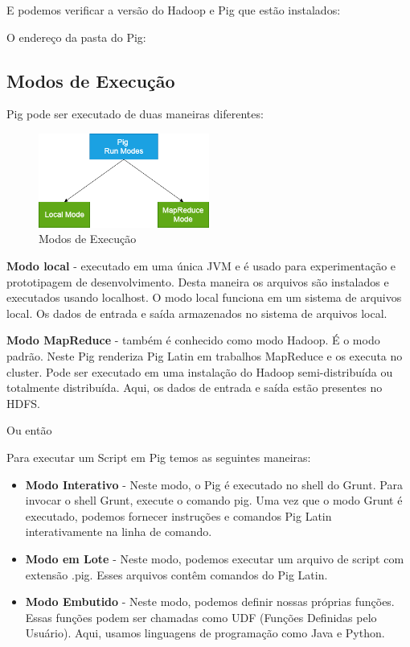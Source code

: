 \documentclass[a4paper,11pt]{article}
\begin{document}


E podemos verificar a versão do Hadoop e Pig que estão instalados: \\

O endereço da pasta do Pig: \\

\subsection{Modos de Execução}
Pig pode ser executado de duas maneiras diferentes:
\begin{figure}[H]
	\centering
	\includegraphics[width=0.5\textwidth]{imagem/modos}
	\caption{Modos de Execução}
\end{figure}

\textbf{Modo local} - executado em uma única JVM e é usado para experimentação e prototipagem de desenvolvimento. Desta maneira os arquivos são instalados e executados usando localhost. O modo local funciona em um sistema de arquivos local. Os dados de entrada e saída armazenados no sistema de arquivos local. \\

\textbf{Modo MapReduce} - também é conhecido como modo Hadoop. É o modo padrão. Neste Pig renderiza Pig Latin em trabalhos MapReduce e os executa no cluster. Pode ser executado em uma instalação do Hadoop semi-distribuída ou totalmente distribuída. Aqui, os dados de entrada e saída estão presentes no HDFS. \\

Ou então \\

Para executar um Script em Pig temos as seguintes maneiras: \vspace{-1em}
\begin{itemize}
	\item \textbf{Modo Interativo} - Neste modo, o Pig é executado no shell do Grunt. Para invocar o shell Grunt, execute o comando pig. Uma vez que o modo Grunt é executado, podemos fornecer instruções e comandos Pig Latin interativamente na linha de comando.
	\item \textbf{Modo em Lote} - Neste modo, podemos executar um arquivo de script com extensão .pig. Esses arquivos contêm comandos do Pig Latin.
	\item \textbf{Modo Embutido} - Neste modo, podemos definir nossas próprias funções. Essas funções podem ser chamadas como UDF (Funções Definidas pelo Usuário). Aqui, usamos linguagens de programação como Java e Python.
\end{itemize}
\end{document}

